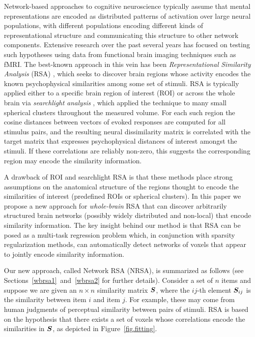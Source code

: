 Network-based approaches to cognitive neuroscience typically assume that mental representations are encoded as distributed patterns of activation over large neural populations, with different populations encoding different kinds of representational structure and communicating this structure to other network components. Extensive research over the past several years has focused on testing such hypotheses using data from functional brain imaging techniques such as fMRI. The best-known approach in this vein has been \emph{Representational Similarity Analysis} (RSA) \cite{RSA}, which seeks to discover brain regions whose activity encodes the known psychophysical similarities among some set of stimuli. RSA is typically applied either to a specific brain region of interest (ROI) or across the whole brain via {\em searchlight analysis} \cite{searchlight}, which applied the technique to many small spherical clusters throughout the measured volume. For each such region the cosine distances between vectors of evoked responses are computed for all stimulus pairs, and the resulting neural dissimilarity matrix is correlated with the target matrix that expresses psychophysical distances of interest amongst the stimuli. If these correlations are reliably non-zero, this suggests the corresponding region may encode the similarity information.

A drawback of ROI and searchlight RSA is that these methods place strong assumptions on the anatomical structure of the regions thought to encode the similarities of interest (predefined ROIs or spherical clusters). In this paper we propose a new approach for {\em whole-brain} RSA that can discover arbitrarily structured brain networks (possibly widely
distributed and non-local) that encode similarity information. The key insight behind our method is that RSA can be posed as a multi-task regression problem which, in conjunction with sparsity regularization methods, can automatically detect networks of voxels that appear to jointly encode similarity information.

Our new approach, called Network RSA (NRSA), is summarized as follows (see Sections~\ref{wbrsa1}~and~\ref{wbrsa2} for further details).  Consider a set of $n$ items and suppose we are given an $n \times n$ similarity matrix $\boldsymbol{S}$, where the $ij$-th element $\boldsymbol{S}_{ij}$ is the similarity\cite{similarity} between item $i$ and item $j$. For example, these may come from human judgments of perceptual similarity between pairs of stimuli.  RSA is based on the hypothesis that there exists a set of voxels whose correlations encode the similarities in $\boldsymbol{S}$, as depicted in Figure~\ref{fig.fitting}.


